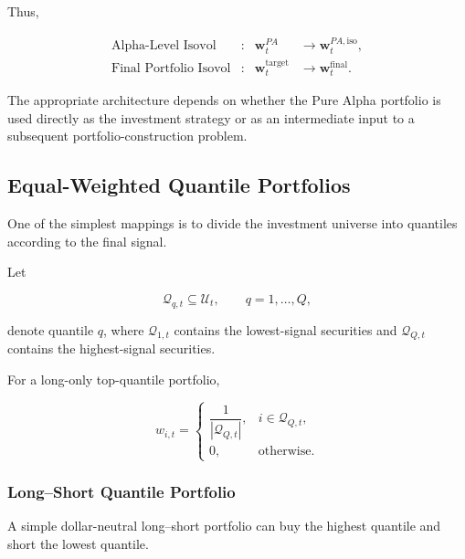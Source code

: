 \documentclass[11pt,a4paper]{article}
\begin{document}
Thus,

\begin{equation}
\boxed{
\begin{aligned}
\text{Alpha-Level Isovol}
&:
&
\mathbf{w}_t^{PA}
&\rightarrow
\mathbf{w}_t^{PA,\mathrm{iso}},
\\[3pt]
\text{Final Portfolio Isovol}
&:
&
\mathbf{w}_t^{\mathrm{target}}
&\rightarrow
\mathbf{w}_t^{\mathrm{final}}.
\end{aligned}
}
\end{equation}

The appropriate architecture depends on whether the Pure Alpha portfolio is
used directly as the investment strategy or as an intermediate input to a
subsequent portfolio-construction problem.


\subsection{Equal-Weighted Quantile Portfolios}
\label{subsec:equal_weighted_quantile_portfolios}

One of the simplest mappings is to divide the investment universe into
quantiles according to the final signal.

Let

\begin{equation}
\mathcal{Q}_{q,t}
\subseteq
\mathcal{U}_t,
\qquad
q=1,\ldots,Q,
\end{equation}

denote quantile $q$, where $\mathcal{Q}_{1,t}$ contains the lowest-signal
securities and $\mathcal{Q}_{Q,t}$ contains the highest-signal securities.

For a long-only top-quantile portfolio,

\begin{equation}
\boxed{
w_{i,t}
=
\begin{cases}
\dfrac{1}{|\mathcal{Q}_{Q,t}|},
&
i\in\mathcal{Q}_{Q,t},
\\[0.25cm]
0,
&
\text{otherwise}.
\end{cases}
}
\end{equation}


\subsubsection{Long--Short Quantile Portfolio}

A simple dollar-neutral long--short portfolio can buy the highest quantile and
short the lowest quantile.
\end{document}
